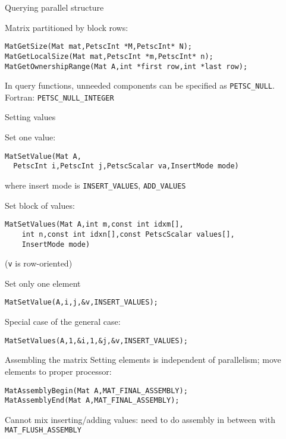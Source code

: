 \begin{numberedframe}{Querying parallel structure}

Matrix partitioned by block rows:
\begin{lstlisting}
MatGetSize(Mat mat,PetscInt *M,PetscInt* N);
MatGetLocalSize(Mat mat,PetscInt *m,PetscInt* n);
MatGetOwnershipRange(Mat A,int *first row,int *last row);
\end{lstlisting}
 In query functions, unneeded components can be specified as
 \lstinline{PETSC_NULL}.\\
 Fortran: \lstinline{PETSC_NULL_INTEGER}
\end{numberedframe}

\begin{numberedframe}{Setting values}

Set one value:
\begin{lstlisting}
MatSetValue(Mat A,
  PetscInt i,PetscInt j,PetscScalar va,InsertMode mode)
\end{lstlisting}
where insert mode is \lstinline{INSERT_VALUES}, \lstinline{ADD_VALUES}

Set block of values:
\begin{lstlisting}
MatSetValues(Mat A,int m,const int idxm[],
    int n,const int idxn[],const PetscScalar values[],
    InsertMode mode)
\end{lstlisting}
(\lstinline{v} is row-oriented)
\end{numberedframe}

\begin{numberedframe}{Set only one element}
\begin{lstlisting}
MatSetValue(A,i,j,&v,INSERT_VALUES);
\end{lstlisting}
Special case of the general case:
\begin{lstlisting}
MatSetValues(A,1,&i,1,&j,&v,INSERT_VALUES);
\end{lstlisting}
\end{numberedframe}

\begin{numberedframe}{Assembling the matrix}
Setting elements is independent of parallelism; move elements to
proper processor:
\begin{lstlisting}
MatAssemblyBegin(Mat A,MAT_FINAL_ASSEMBLY);
MatAssemblyEnd(Mat A,MAT_FINAL_ASSEMBLY);
\end{lstlisting}

Cannot mix inserting/adding values: need to do assembly in between
with \lstinline{MAT_FLUSH_ASSEMBLY}
\end{numberedframe}

